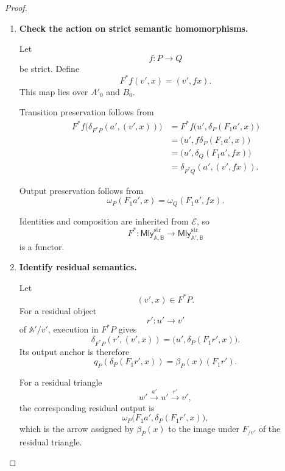 \begin{proof}
\begin{enumerate}
        \item \textbf{Check the action on strict semantic homomorphisms.}

        Let
        \[
            f:P\to Q
        \]
        be strict. Define
        \[
            F^*f(v',x)=(v',fx).
        \]
        This map lies over \(A'_0\) and \(B_0\).

        Transition preservation follows from
        \[
        \begin{aligned}
            F^*f
            \bigl(
                \delta_{F^*P}(a',(v',x))
            \bigr)
            &=
            F^*f
            \bigl(
                u',
                \delta_P(F_1a',x)
            \bigr)
            \\
            &=
            \bigl(
                u',
                f\delta_P(F_1a',x)
            \bigr)
            \\
            &=
            \bigl(
                u',
                \delta_Q(F_1a',fx)
            \bigr)
            \\
            &=
            \delta_{F^*Q}(a',(v',fx)).
        \end{aligned}
        \]

        Output preservation follows from
        \[
            \omega_P(F_1a',x)
            =
            \omega_Q(F_1a',fx).
        \]

        Identities and composition are inherited from \(\mathcal E\), so
        \[
            F^*:
            \mathsf{Mly}^{\mathrm{str}}_{\mathbb A,\mathbb B}
            \to
            \mathsf{Mly}^{\mathrm{str}}_{\mathbb A',\mathbb B}
        \]
        is a functor.

        \item \textbf{Identify residual semantics.}

        Let
        \[
            (v',x)\in F^*P.
        \]
        For a residual object
        \[
            r':u'\to v'
        \]
        of \(\mathbb A'/v'\), execution in \(F^*P\) gives
        \[
            \delta_{F^*P}(r',(v',x))
            =
            \bigl(
                u',
                \delta_P(F_1r',x)
            \bigr).
        \]
        Its output anchor is therefore
        \[
            q_P(\delta_P(F_1r',x))
            =
            \beta_P(x)(F_1r').
        \]

        For a residual triangle
        \[
            w'\xrightarrow{a'}u'\xrightarrow{r'}v',
        \]
        the corresponding residual output is
        \[
            \omega_P
            \bigl(
                F_1a',
                \delta_P(F_1r',x)
            \bigr),
        \]
        which is the arrow assigned by \(\beta_P(x)\) to the image under
        \(F_{/v'}\) of the residual triangle.


\end{enumerate}
\end{proof}
